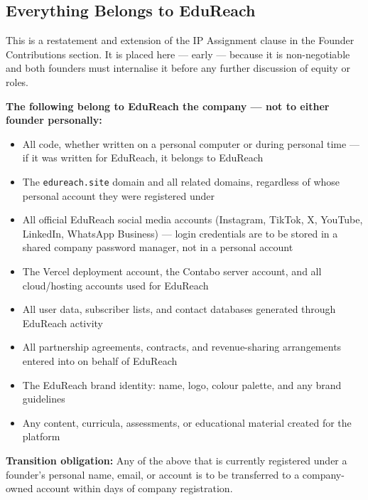 \documentclass[12pt,a4paper]{article}
\newcommand{\blank}[1][5.5cm]{\underline{\hspace{#1}}}
\begin{document}
\subsection{Everything Belongs to EduReach}

This is a restatement and extension of the IP Assignment clause in the Founder Contributions section. It is placed here --- early --- because it is non-negotiable and both founders must internalise it before any further discussion of equity or roles.

\noindent\textbf{The following belong to EduReach the company --- not to either founder personally:}

\begin{itemize}
  \item All code, whether written on a personal computer or during personal time --- if it was written for EduReach, it belongs to EduReach
  \item The \texttt{edureach.site} domain and all related domains, regardless of whose personal account they were registered under
  \item All official EduReach social media accounts (Instagram, TikTok, X, YouTube, LinkedIn, WhatsApp Business) --- login credentials are to be stored in a shared company password manager, not in a personal account
  \item The Vercel deployment account, the Contabo server account, and all cloud/hosting accounts used for EduReach
  \item All user data, subscriber lists, and contact databases generated through EduReach activity
  \item All partnership agreements, contracts, and revenue-sharing arrangements entered into on behalf of EduReach
  \item The EduReach brand identity: name, logo, colour palette, and any brand guidelines
  \item Any content, curricula, assessments, or educational material created for the platform
\end{itemize}

\noindent\textbf{Transition obligation:} Any of the above that is currently registered under a founder's personal name, email, or account is to be transferred to a company-owned account within \blank[2cm] days of company registration.
\end{document}
